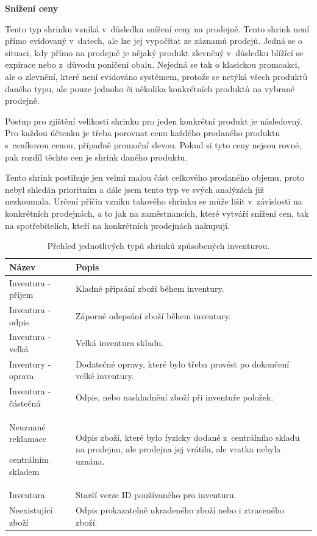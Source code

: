 \textbf{Snížení ceny}
 
Tento typ shrinku vzniká v~důsledku snížení ceny na prodejně. Tento shrink není přímo evidovaný v~datech, ale lze jej vypočítat ze záznamů prodejů. Jedná se o situaci, kdy přímo na prodejně je nějaký produkt zlevněný v~důsledku blížící se expirace nebo z~důvodu poničení obalu. Nejedná se tak o klasickou promoakci, ale o zlevnění, které není evidováno systémem, protože se netýká všech produktů daného typu, ale pouze jednoho či několika konkrétních produktů na vybrané prodejně.

Postup pro zjištění velikosti shrinku pro jeden konkrétní produkt je následovný. Pro každou účtenku je třeba porovnat cenu každého prodaného produktu s~ceníkovou cenou, případně promoční slevou. Pokud si tyto ceny nejsou rovné, pak rozdíl těchto cen je shrink daného produktu.

Tento shrink postihuje jen velmi malou část celkového prodaného objemu, proto  nebyl shledán prioritním a dále jsem tento typ ve svých analýzách již nezkoumala. Určení příčin vzniku takového shrinku se může lišit v~závislosti na konkrétních prodejnách, a to jak na zaměstnancích, které vytváří snížení cen, tak na spotřebitelích, kteří na konkrétních prodejnách nakupují.

\begin{table}[hbtp!]
    \caption{Přehled jednotlivých typů shrinků  způsobených inventurou.}
    \label{tab:sh:inv}
    \begin{tabular}{ p{4cm} p{10.5cm}}
     Název             & Popis \\
    \hline
              Inventura - příjem           & Kladné připsání zboží během inventury.      \\
              Inventura - odpis           & Záporné odepsání zboží během inventury.      \\
              Inventura - velká             & Velká inventura skladu.     \\
              Inventury - oprava       & Dodatečné opravy, které bylo třeba provést po dokončení velké inventury.      \\
              Inventura - částečná    & Odpis, nebo naskladnění zboží při inventuře položek.      \\
              Neuznané reklamace \par centrálním skladem  \strut &  Odpis zboží, které bylo fyzicky dodané z~centrálního skladu na prodejnu, ale prodejna jej vrátila, ale vratka nebyla uznána.     \\
              Inventura              & Starší verze ID používaného pro inventuru.\\
              Neexistující zboží     & Odpis prokazatelně ukradeného zboží nebo i ztraceného zboží.      \\
    \end{tabular}
\end{table}

